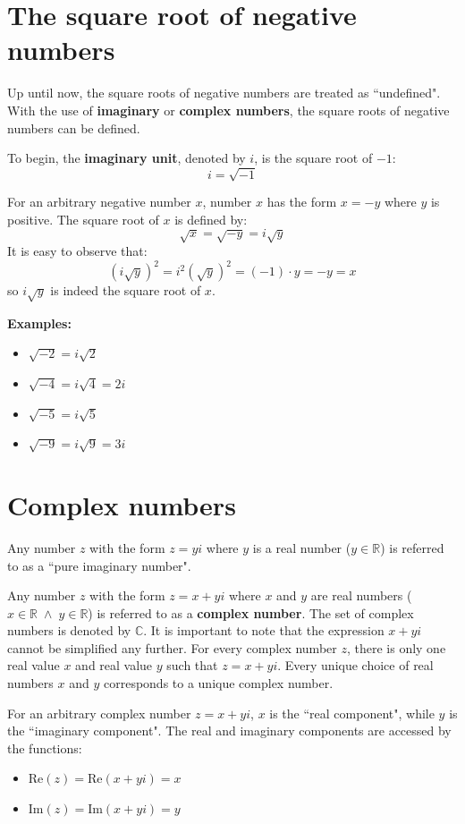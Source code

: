 \documentclass{article}
\begin{document}
\section*{The square root of negative numbers}

Up until now, the square roots of negative numbers are treated as ``undefined". With the use of {\bf imaginary} or {\bf complex numbers}, the square roots of negative numbers can be defined.

To begin, the {\bf imaginary unit}, denoted by \(i\), is the square root of \(-1\):
\[i = \sqrt{-1}\]

For an arbitrary negative number \(x\), number \(x\) has the form \(x = -y\) where \(y\) is positive. The square root of \(x\) is defined by:
\[\sqrt{x} = \sqrt{-y} = i\sqrt{y}\]
It is easy to observe that:
\[(i\sqrt{y})^2 = i^2(\sqrt{y})^2 = (-1) \cdot y = -y = x\]
so \(i\sqrt{y}\) is indeed the square root of \(x\).

\textbf{Examples:}
\begin{itemize}
\item \(\sqrt{-2} = i\sqrt{2}\)
\item \(\sqrt{-4} = i\sqrt{4} = 2i\)
\item \(\sqrt{-5} = i\sqrt{5}\)
\item \(\sqrt{-9} = i\sqrt{9} = 3i\)
\end{itemize}




\section*{Complex numbers}

Any number \(z\) with the form \(z = yi\) where \(y\) is a real number (\(y \in \mathbb{R}\)) is referred to as a ``pure imaginary number".

Any number \(z\) with the form \(z = x + yi\) where \(x\) and \(y\) are real numbers (\(x \in \mathbb{R} \;\wedge\; y \in \mathbb{R}\)) is referred to as a {\bf complex number}. The set of complex numbers is denoted by \(\mathbb{C}\). It is important to note that the expression \(x + yi\) cannot be simplified any further. For every complex number \(z\), there is only one real value \(x\) and real value \(y\) such that \(z = x + yi\). Every unique choice of real numbers \(x\) and \(y\) corresponds to a unique complex number.  

For an arbitrary complex number \(z = x + yi\), \(x\) is the ``real component", while \(y\) is the ``imaginary component". The real and imaginary components are accessed by the functions:
\begin{itemize}
\item \(\text{Re}(z) = \text{Re}(x + yi) = x\)
\item \(\text{Im}(z) = \text{Im}(x + yi) = y\) 
\end{itemize}
\end{document}

